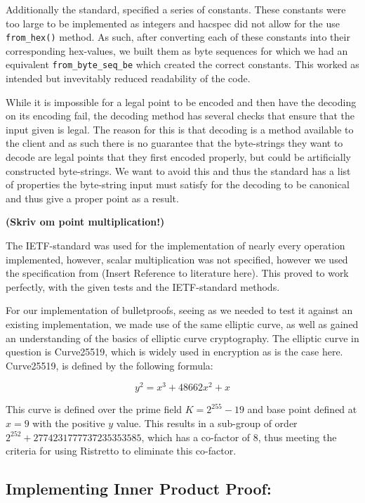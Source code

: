 \documentclass{article}
\begin{document}
Additionally the standard, specified a series of constants. These
constants were too large to be implemented as integers and hacspec
did not allow for the use \texttt{from\_hex()} method. As such, after
converting each of these constants into their corresponding hex-values,
we built them as byte sequences for which we had an equivalent
\texttt{from\_byte\_seq\_be} which created the correct constants. This
worked as intended but invevitably reduced readability of the code.

While it is impossible for a legal point to be encoded and then have the
decoding on its encoding fail, the decoding method has several checks
that ensure that the input given is legal. The reason for this
is that decoding is a method available to the client and as such there
is no guarantee that the byte-strings they want to decode are legal
points that they first encoded properly, but could be artificially
constructed byte-strings. We want to avoid this and thus the standard
has a list of properties the byte-string input must satisfy for the
decoding to be canonical and thus give a proper point as a result.

\textbf{(Skriv om point multiplication!)}

The IETF-standard was used for the implementation of nearly every operation implemented, however, scalar multiplication was not specified, however we used the specification from (Insert Reference to literature here). This proved to work perfectly, with the given tests and the IETF-standard methods. 

For our implementation of bulletproofs, seeing as we needed to test it
against an existing implementation, we made use of the same elliptic
curve, as well as gained an understanding of the basics of elliptic
curve cryptography. The elliptic curve in question is Curve25519, which
is widely used in encryption as is the case here. Curve25519, is defined by the following formula:

$$y^2 = x^3 + 48662x^2 + x$$

This curve is defined over the prime field $K = 2^{255} - 19$ and base
point defined at $x = 9$ with the positive $y$ value. This results in a
sub-group of order $2^{252} + 2774231777737235353585$, which has a
co-factor of $8$, thus meeting the criteria for using Ristretto to eliminate this co-factor.

\subsection{Implementing Inner Product Proof:}
\end{document}
